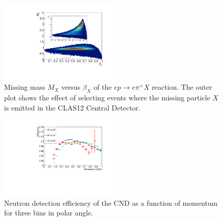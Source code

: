 \begin{figure}[htb]  
\begin{center}
\includegraphics[width=0.5\textwidth]{Figure/SelectionPlots.pdf}
\caption {Missing mass $M_X$ versus $\beta_X$ of the $e p \rightarrow e\pi^+X$ reaction. The outer plot shows the effect of selecting events where the missing particle $X$ is emitted in the CLAS12 Central Detector.}
\label{fig_performance_selection}
\end{center}
\end{figure}

\begin{figure}[htb]  
\begin{center}
\includegraphics[width=0.5\textwidth]{Figure/newEfficiency.pdf}
\caption {Neutron detection efficiency of the CND as a function of momentum for three bins in polar angle.}
\label{fig_performance_efficiency}
\end{center}
\end{figure}

